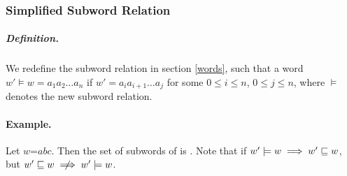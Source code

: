 \subsubsection{Simplified Subword Relation}

\subparagraph{Definition.} 
\label{newsubword}
We redefine the subword relation in section \ref{words}, such that a word $w' \models w = a_1a_2\ldots a_n$ if $w' = a_ia_{i+1}\ldots a_j$ for some $0 \leq i \leq n$, $0 \leq j \leq n$, where $\models$ denotes the new subword relation. 

\paragraph{Example.} Let $w$=$abc$. Then the set of subwords of  is . Note that if $w' \models w \implies w' \sqsubseteq w$, but $w' \subword w \centernot\implies w' \models w$. 

